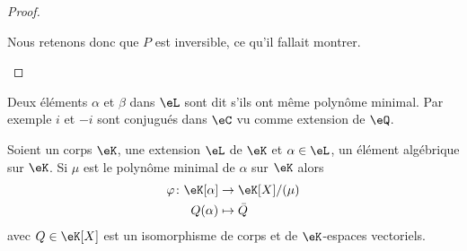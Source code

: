 \begin{proof}
\begin{enumerate}
            Nous retenons donc que \( P\) est inversible, ce qu'il fallait montrer.
    \end{enumerate}
\end{proof}

\begin{definition}
    Deux éléments \( \alpha\) et \( \beta\) dans \( \eL\) sont dit  s'ils ont même polynôme minimal. Par exemple \( i\) et \( -i\) sont conjugués dans \( \eC\) vu comme extension de \( \eQ\).
\end{definition}

\begin{lemma}       \label{LEMooHKTMooKEoOuK}
    Soient un corps \( \eK\), une extension \( \eL\) de \( \eK\) et \( \alpha\in \eL\), un élément algébrique sur \( \eK\). Si \( \mu\) est le polynôme minimal de \( \alpha\) sur \( \eK\) alors
    \begin{equation}
        \begin{aligned}
            \varphi\colon \eK[\alpha]&\to \eK[X]/(\mu) \\
            Q(\alpha)&\mapsto \bar Q
        \end{aligned}
    \end{equation}
    avec \( Q\in\eK[X]\) est un isomorphisme de corps et de \( \eK\)-espaces vectoriels.
\end{lemma}

